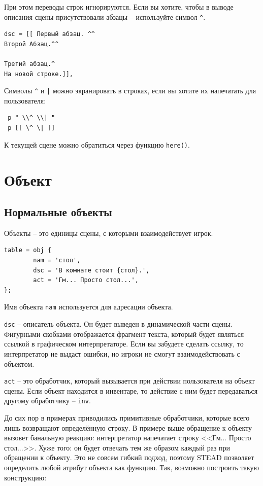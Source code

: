 \documentclass[12pt]{article}
\begin{document}
При этом переводы строк игнорируются. Если вы хотите, чтобы в выводе описания сцены присутствовали абзацы -- используйте символ \verb/^/.

\begin{verbatim}
dsc = [[ Первый абзац. ^^
Второй Абзац.^^

Третий абзац.^
На новой строке.]],
\end{verbatim}

Символы \verb/^/ и \verb/|/ можно экранировать в строках, если вы хотите их напечатать для пользователя:

\begin{verbatim}
 p " \\^ \\| "
 p [[ \^ \| ]]
\end{verbatim}

К текущей сцене можно обратиться через функцию \verb/here()/.

\section{Объект}
\subsection{Нормальные объекты}
Объекты -- это единицы сцены, с которыми взаимодействует игрок.

\begin{verbatim}
table = obj {
        nam = 'стол',
        dsc = 'В комнате стоит {стол}.',
        act = 'Гм... Просто стол...',
};
\end{verbatim}

Имя объекта \verb/nam/ используется для адресации объекта.

\verb/dsc/ -- описатель объекта. Он будет выведен в динамической части сцены. Фигурными скобками отображается фрагмент текста, который будет являться ссылкой в графическом интерпретаторе. Если вы забудете сделать ссылку, то интерпретатор не выдаст ошибки, но игроки не смогут взаимодействовать с объектом.

\index{Атрибуты!act}
\verb/act/ -- это обработчик, который вызывается при действии пользователя на объект сцены. Если объект находится в инвентаре, то действие с ним будет передаваться другому обработчику -- \verb/inv/.

До сих пор в примерах приводились примитивные обработчики, которые всего лишь возвращают определённую строку. В примере выше обращение к объекту вызовет банальную реакцию: интерпретатор напечатает строку <<Гм... Просто стол...>>. Хуже того: он будет отвечать тем же образом каждый раз при обращении к объекту. Это не совсем гибкий подход, поэтому STEAD позволяет определить любой атрибут объекта как функцию. Так, возможно построить такую конструкцию:
\end{document}
